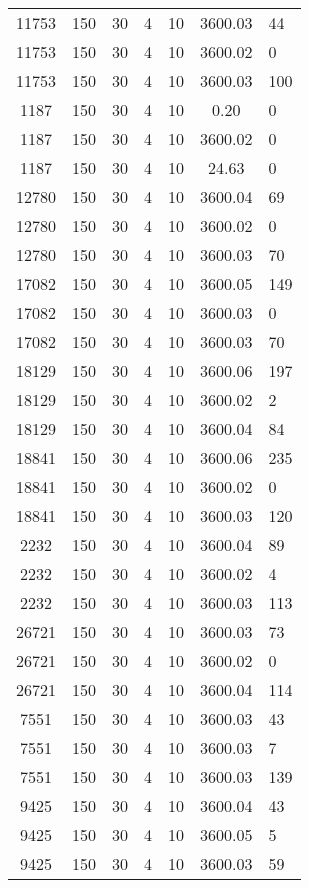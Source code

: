 \begin{tabular}[center]{cccccc}
11753   & 150 & 30 & 4 & 10 & 3600.03 & 44  \\
11753   & 150 & 30 & 4 & 10 & 3600.02 & 0   \\
11753   & 150 & 30 & 4 & 10 & 3600.03 & 100 \\
1187    & 150 & 30 & 4 & 10 & 0.20    & 0   \\
1187    & 150 & 30 & 4 & 10 & 3600.02 & 0   \\
1187    & 150 & 30 & 4 & 10 & 24.63   & 0   \\
12780   & 150 & 30 & 4 & 10 & 3600.04 & 69  \\
12780   & 150 & 30 & 4 & 10 & 3600.02 & 0   \\
12780   & 150 & 30 & 4 & 10 & 3600.03 & 70  \\
17082   & 150 & 30 & 4 & 10 & 3600.05 & 149 \\
17082   & 150 & 30 & 4 & 10 & 3600.03 & 0   \\
17082   & 150 & 30 & 4 & 10 & 3600.03 & 70  \\
18129   & 150 & 30 & 4 & 10 & 3600.06 & 197 \\
18129   & 150 & 30 & 4 & 10 & 3600.02 & 2   \\
18129   & 150 & 30 & 4 & 10 & 3600.04 & 84  \\
18841   & 150 & 30 & 4 & 10 & 3600.06 & 235 \\
18841   & 150 & 30 & 4 & 10 & 3600.02 & 0   \\
18841   & 150 & 30 & 4 & 10 & 3600.03 & 120 \\
2232    & 150 & 30 & 4 & 10 & 3600.04 & 89  \\
2232    & 150 & 30 & 4 & 10 & 3600.02 & 4   \\
2232    & 150 & 30 & 4 & 10 & 3600.03 & 113 \\
26721   & 150 & 30 & 4 & 10 & 3600.03 & 73  \\
26721   & 150 & 30 & 4 & 10 & 3600.02 & 0   \\
26721   & 150 & 30 & 4 & 10 & 3600.04 & 114 \\
7551    & 150 & 30 & 4 & 10 & 3600.03 & 43  \\
7551    & 150 & 30 & 4 & 10 & 3600.03 & 7   \\
7551    & 150 & 30 & 4 & 10 & 3600.03 & 139 \\
9425    & 150 & 30 & 4 & 10 & 3600.04 & 43  \\
9425    & 150 & 30 & 4 & 10 & 3600.05 & 5   \\
9425    & 150 & 30 & 4 & 10 & 3600.03 & 59  \\

\end{tabular}
